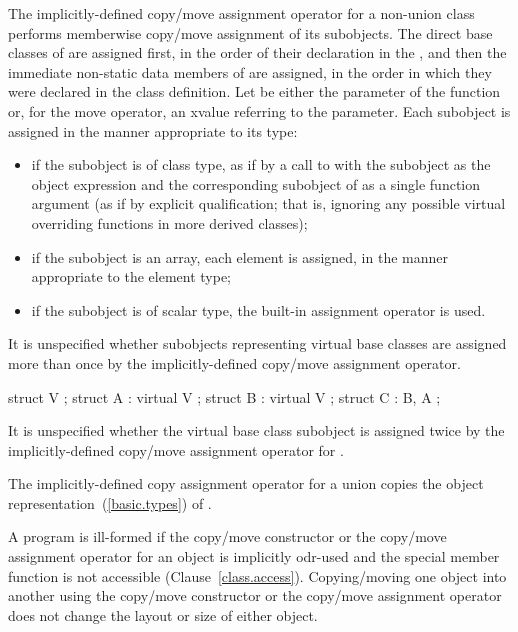 \pnum
The implicitly-defined copy/move assignment operator for a
non-union class  performs memberwise copy/move assignment of its subobjects. The direct
base classes of  are assigned first, in the order of their declaration in the
, and then the immediate non-static data members of
 are assigned, in the order in which they were declared in the class
definition.
Let  be either the parameter of the function or, for the move operator, an
xvalue referring to the parameter.
Each subobject is assigned in the manner appropriate to its type:

\begin{itemize}
\item
if the subobject is of class type,
as if by a call to  with the subobject as the object expression
and the corresponding subobject of  as a single function argument
(as if by explicit qualification; that is,
ignoring any possible virtual overriding functions in more derived classes);
\item
if the subobject is an array, each element is assigned,
in the manner appropriate to the element type;
\item
if the subobject is of scalar type,
the built-in assignment operator is used.
\end{itemize}

%
It is unspecified whether subobjects representing virtual base classes
are assigned more than once by the implicitly-defined copy/move assignment
operator.
\enterexample

\begin{codeblock}
struct V { };
struct A : virtual V { };
struct B : virtual V { };
struct C : B, A { };
\end{codeblock}

It is unspecified whether the virtual base class subobject
is assigned twice by the implicitly-defined copy/move assignment operator for
.
\exitexample

\pnum
The implicitly-defined copy assignment operator for a
union  copies the object representation~(\ref{basic.types}) of .%
%

\pnum
{}%
%
%
%
A program is ill-formed if the copy/move constructor or the copy/move assignment
operator for an object is implicitly odr-used and the special member function
is not accessible (Clause~\ref{class.access}).
\enternote
Copying/moving one object into another using the copy/move constructor or
the copy/move assignment operator does not change the layout or size of either
object.
\exitnote

